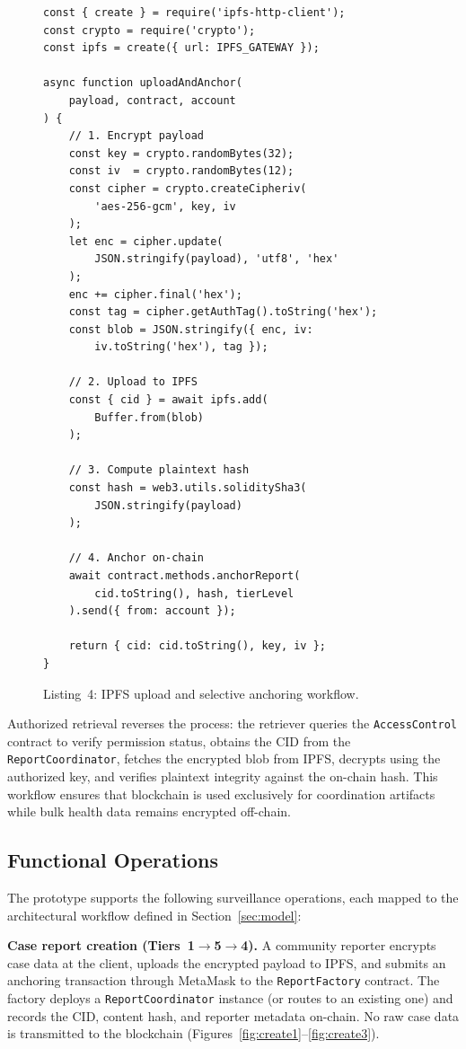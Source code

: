\documentclass[AMA,LATO1COL]{WileyNJD-v2}
\begin{document}
\begin{figure}[!ht]
\begin{verbatim}
const { create } = require('ipfs-http-client');
const crypto = require('crypto');
const ipfs = create({ url: IPFS_GATEWAY });

async function uploadAndAnchor(
    payload, contract, account
) {
    // 1. Encrypt payload
    const key = crypto.randomBytes(32);
    const iv  = crypto.randomBytes(12);
    const cipher = crypto.createCipheriv(
        'aes-256-gcm', key, iv
    );
    let enc = cipher.update(
        JSON.stringify(payload), 'utf8', 'hex'
    );
    enc += cipher.final('hex');
    const tag = cipher.getAuthTag().toString('hex');
    const blob = JSON.stringify({ enc, iv:
        iv.toString('hex'), tag });

    // 2. Upload to IPFS
    const { cid } = await ipfs.add(
        Buffer.from(blob)
    );

    // 3. Compute plaintext hash
    const hash = web3.utils.soliditySha3(
        JSON.stringify(payload)
    );

    // 4. Anchor on-chain
    await contract.methods.anchorReport(
        cid.toString(), hash, tierLevel
    ).send({ from: account });

    return { cid: cid.toString(), key, iv };
}
\end{verbatim}
\caption*{Listing~4: IPFS upload and selective anchoring workflow.}\label{lst:ipfs}
\end{figure}

Authorized retrieval reverses the process: the retriever queries the \texttt{AccessControl} contract to verify permission status, obtains the CID from the \texttt{ReportCoordinator}, fetches the encrypted blob from IPFS, decrypts using the authorized key, and verifies plaintext integrity against the on-chain hash. This workflow ensures that blockchain is used exclusively for coordination artifacts while bulk health data remains encrypted off-chain.

\subsection{Functional Operations}\label{subsec:operations}

The prototype supports the following surveillance operations, each mapped to the architectural workflow defined in Section~\ref{sec:model}:

\textbf{Case report creation (Tiers~1$\rightarrow$5$\rightarrow$4).} A community reporter encrypts case data at the client, uploads the encrypted payload to IPFS, and submits an anchoring transaction through MetaMask to the \texttt{ReportFactory} contract. The factory deploys a \texttt{ReportCoordinator} instance (or routes to an existing one) and records the CID, content hash, and reporter metadata on-chain. No raw case data is transmitted to the blockchain (Figures~\ref{fig:create1}--\ref{fig:create3}).
\end{document}
